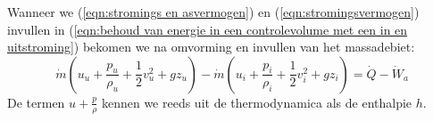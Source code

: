Wanneer we (\ref{eqn:stromings en asvermogen}) en (\ref{eqn:stromingsvermogen}) invullen in (\ref{eqn:behoud van energie in een controlevolume met een in en uitstroming}) bekomen we na omvorming en invullen van het massadebiet:
\begin{equation}
	\dot{m} (u_u + \frac{p_u}{\rho_u} + \frac{1}{2}v^2_u + g z_u) - \dot{m} (u_i + \frac{p_i}{\rho_i}+ \frac{1}{2}v^2_i + g z_i) = \dot{Q}-\dot{W}_a
	\label{eqn:behoud van energie in een controlevolume met een in en uitstroming asvermogen}
\end{equation}
De termen $u + \frac{p}{\rho}$ kennen we reeds uit de thermodynamica als de enthalpie $h$.

